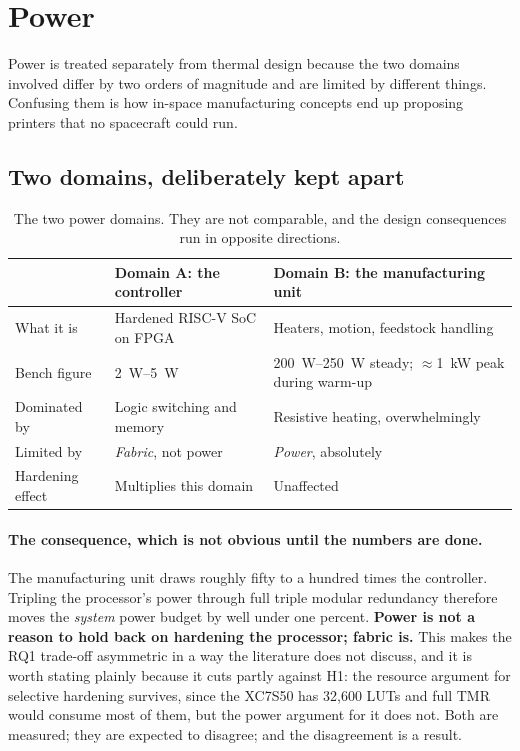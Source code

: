 \documentclass[11pt,a4paper]{article}
\begin{document}
\section{Power}
\label{sec:power}

Power is treated separately from thermal design because the two domains involved
differ by two orders of magnitude and are limited by different things. Confusing
them is how in-space manufacturing concepts end up proposing printers that no
spacecraft could run.

\subsection{Two domains, deliberately kept apart}

\begin{table}[htbp]
\centering
\caption{The two power domains. They are not comparable, and the design
consequences run in opposite directions.}
\label{tab:powerdomains}
\small
\begin{tabularx}{\textwidth}{@{}L{3.0cm} L{3.4cm} X@{}}
\toprule
& \textbf{Domain A: the controller} & \textbf{Domain B: the manufacturing unit} \\
\midrule
What it is & Hardened RISC-V SoC on FPGA & Heaters, motion, feedstock handling \\
Bench figure & \SIrange{2}{5}{\watt} & \SIrange{200}{250}{\watt} steady;
\(\approx\)\SI{1}{\kilo\watt} peak during warm-up \\
Dominated by & Logic switching and memory & Resistive heating, overwhelmingly \\
Limited by & \emph{Fabric}, not power & \emph{Power}, absolutely \\
Hardening effect & Multiplies this domain & Unaffected \\
\bottomrule
\end{tabularx}
\end{table}

\paragraph{The consequence, which is not obvious until the numbers are done.}
The manufacturing unit draws roughly fifty to a hundred times the controller.
Tripling the processor's power through full triple modular redundancy therefore
moves the \emph{system} power budget by well under one percent. \textbf{Power is
not a reason to hold back on hardening the processor; fabric is.} This makes the
RQ1 trade-off asymmetric in a way the literature does not discuss, and it is
worth stating plainly because it cuts partly against H1: the resource argument
for selective hardening survives, since the XC7S50 has 32{,}600 LUTs and full
TMR would consume most of them, but the power argument for it does not. Both are
measured; they are expected to disagree; and the disagreement is a result.
\end{document}
